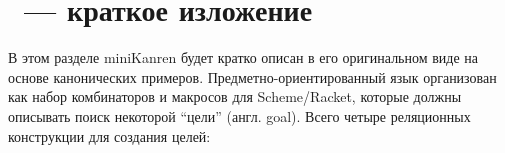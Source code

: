 
\section{\miniKanren~--- краткое изложение}
\label{sec:demo}

В этом разделе miniKanren будет кратко описан в его оригинальном виде на основе канонических примеров.
Предметно-ориентированный язык организован как набор комбинаторов и макросов для Scheme/Racket, которые должны описывать поиск некоторой \enquote{цели} (англ. goal).
Всего четыре реляционных конструкции для создания целей:

